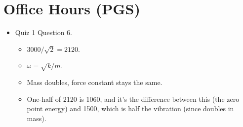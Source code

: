 \documentclass[../notes.tex]{subfiles}
\begin{document}
\section{Office Hours (PGS)}
\begin{itemize}
    \item {}Quiz 1 Question 6.
    \begin{itemize}
        \item $3000/\sqrt{2}=2120$.
        \item $\omega=\sqrt{k/m}$.
        \item Mass doubles, force constant stays the same.
        \item One-half of 2120 is 1060, and it's the difference between this (the zero point energy) and 1500, which is half the  vibration (since  doubles in mass).
    \end{itemize}
\end{itemize}
\end{document}
